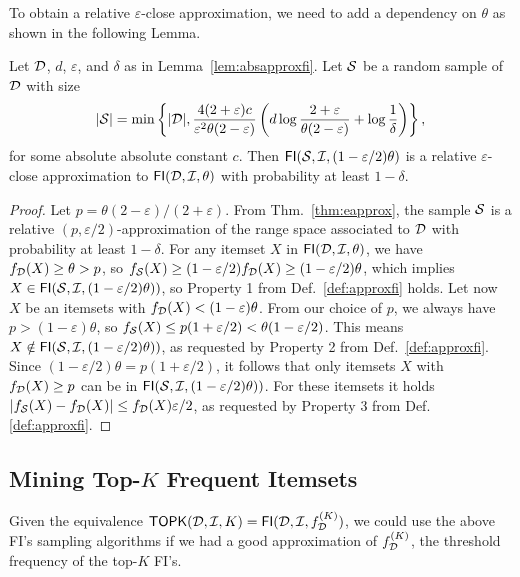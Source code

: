 To obtain a relative $\varepsilon$-close approximation, we
need to add a dependency on $\theta$ as shown in the following Lemma.

\begin{lemma}\label{lem:relapproxfi}
  Let ${\cal D}$, $d$, $\varepsilon$, and $\delta$ as in Lemma~\ref{lem:absapproxfi}. Let
  ${\cal S}$ be a random sample of ${\cal D}$ with size 
  \[
  |{\cal S}| =
  \min\left\{|{\cal D}|,\frac{4(2+\varepsilon)c}{\varepsilon^2\theta(2-\varepsilon)}\left(d\log\frac{2+\varepsilon}{\theta(2-\varepsilon)}+\log\frac{1}{\delta}\right)\right\},\]
  for some absolute absolute constant $c$. Then $\mathsf{FI}({\cal S},{\cal I},(1-\varepsilon/2)\theta)$ is a relative
  $\varepsilon$-close approximation to $\mathsf{FI}({\cal D},{\cal I},\theta)$ with probability
  at least $1-\delta$.
\end{lemma}

\begin{proof}
  Let $p=\theta(2-\varepsilon)/(2+\varepsilon)$. From
  Thm.~\ref{thm:eapprox}, the sample ${\cal S}$ is a relative
  $(p,\varepsilon/2)$-approximation of the range space associated to ${\cal D}$ with
  probability at least $1-\delta$. For any itemset $X$ in
  $\mathsf{FI}({\cal D},{\cal I},\theta)$, we have $f_{\cal D}(X)\ge\theta>p$, so
  $f_{\cal S}(X)\ge (1-\varepsilon/2)f_{\cal D}(X)\ge(1-\varepsilon/2)\theta$, which
  implies $X\in\mathsf{FI}({\cal S},{\cal I},(1-\varepsilon/2)\theta))$, so Property 1
  from Def.~\ref{def:approxfi} holds. Let now $X$ be an itemsets with
  $f_{\cal D}(X)< (1-\varepsilon)\theta$. From our choice of $p$, we always have
  $p>(1-\varepsilon)\theta$, so $f_{\cal S}(X)\le p(1+\varepsilon/2) <
  \theta(1-\varepsilon/2)$. This means
  $X\notin\mathsf{FI}({\cal S},{\cal I},(1-\varepsilon/2)\theta))$, as requested by
  Property 2 from Def.~\ref{def:approxfi}. 
  Since $(1-\varepsilon/2)\theta=p(1+\varepsilon/2)$, it follows
  that only itemsets $X$ with $f_{\cal D}(X)\ge p$ can be in
  $\mathsf{FI}({\cal S},{\cal I},(1-\varepsilon/2)\theta))$. For these itemsets it holds
  $|f_{\cal S}(X)-f_{\cal D}(X)|\le f_{\cal D}(X)\varepsilon/2$, as requested by
  Property 3 from Def.\ref{def:approxfi}.
\end{proof}

\subsection{Mining Top-$K$ Frequent Itemsets}\label{sec:miningtopk}
Given the equivalence
$\mathsf{TOPK}({\cal D},{\cal I},K)=\mathsf{FI}({\cal D},{\cal I},f^{(K)}_{\cal D})$, we could use the above
FI's sampling algorithms if we had a good approximation of $f^{(K)}_{\cal D}$, the
threshold frequency of the top-$K$ FI's.

